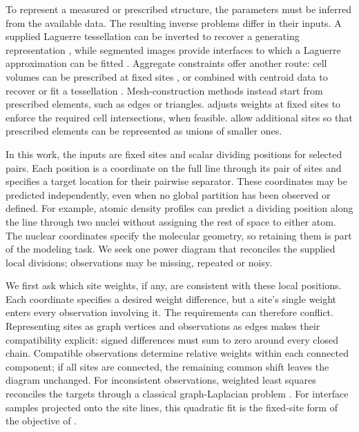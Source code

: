 To represent a measured or prescribed structure, the parameters must be inferred from the available data. The resulting inverse problems differ in their inputs. A supplied Laguerre tessellation can be inverted to recover a generating representation \citep{Duan2014}, while segmented images provide interfaces to which a Laguerre approximation can be fitted \citep{Spettl2016}. Aggregate constraints offer another route: cell volumes can be prescribed at fixed sites \citep{AurenhammerHoffmannAronov1998,BourneKokRoperSpanjer2020}, or combined with centroid data to recover or fit a tessellation \citep{BournePearceRoper2025}. Mesh-construction methods instead start from prescribed elements, such as edges or triangles. \citet{Alexa2020} adjusts weights at fixed sites to enforce the required cell intersections, when feasible. \citet{Bogiokas2025} allow additional sites so that prescribed elements can be represented as unions of smaller ones.

In this work, the inputs are fixed sites and scalar dividing positions for selected pairs. Each position is a coordinate on the full line through its pair of sites and specifies a target location for their pairwise separator. These coordinates may be predicted independently, even when no global partition has been observed or defined. For example, atomic density profiles can predict a dividing position along the line through two nuclei without assigning the rest of space to either atom. The nuclear coordinates specify the molecular geometry, so retaining them is part of the modeling task. We seek one power diagram that reconciles the supplied local divisions; observations may be missing, repeated or noisy.

We first ask which site weights, if any, are consistent with these local positions. Each coordinate specifies a desired weight difference, but a site's single weight enters every observation involving it. The requirements can therefore conflict. Representing sites as graph vertices and observations as edges makes their compatibility explicit: signed differences must sum to zero around every closed chain. Compatible observations determine relative weights within each connected component; if all sites are connected, the remaining common shift leaves the diagram unchanged. For inconsistent observations, weighted least squares reconciles the targets through a classical graph-Laplacian problem \citep{Jiang2011}. For interface samples projected onto the site lines, this quadratic fit is the fixed-site form of the objective of \citet{Spettl2016}.

